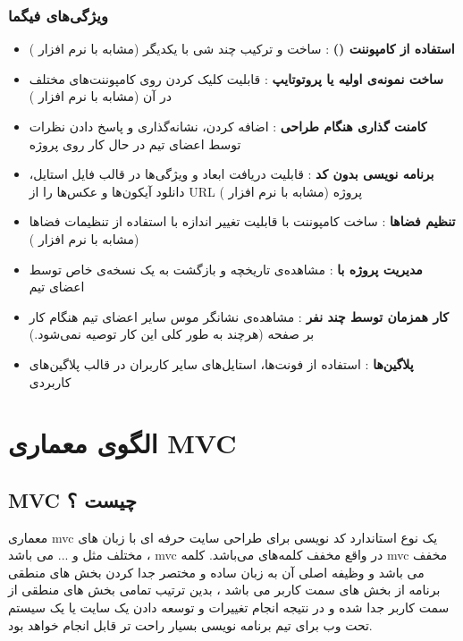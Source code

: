 \subsubsection{ویژگی‌های فیگما}
\begin{itemize}
	\item 
	\textbf{استفاده از کامپوننت ()}
	: ساخت و ترکیب چند شی با یکدیگر (مشابه با نرم افزار )
	\item 
	\textbf{ساخت نمونه‌ی اولیه یا پروتوتایپ}
	: قابلیت کلیک کردن روی کامپوننت‌های مختلف در آن (مشابه با نرم افزار )
	\item 
	\textbf{کامنت گذاری هنگام طراحی}
	: اضافه کردن، نشانه‌گذاری و پاسخ دادن نظرات توسط اعضای تیم در حال کار روی پروژه
	\item 
	\textbf{برنامه نویسی بدون کد}
	: قابلیت دریافت ابعاد و ویژگی‌ها در قالب فایل استایل‌، دانلود آیکون‌ها و عکس‌ها را از URL پروژه (مشابه با نرم افزار )
	\item 
	\textbf{تنظیم فضا‌ها}
	: ساخت کامپوننت‌ با قابلیت تغییر اندازه با استفاده از تنظیمات فضاها (مشابه با نرم افزار )
	\item 
	\textbf{مدیریت پروژه با 
		}
	: مشاهده‌ی تاریخچه و بازگشت به یک نسخه‌ی خاص توسط اعضای تیم
	\item 
	\textbf{کار همزمان توسط چند نفر}
	: مشاهده‌ی نشانگر موس سایر اعضای تیم هنگام کار بر صفحه (هرچند به طور کلی این کار توصیه نمی‌شود.)
	\item 
	\textbf{پلاگین‌ها}
	: استفاده از فونت‌ها، استایل‌های سایر کاربران در قالب پلاگین‌های کاربردی
\end{itemize}


\section{الگوی معماری MVC}
\subsection{MVC‌ چیست ؟}
معماری mvc یک نوع استاندارد کد نویسی برای طراحی سایت حرفه ای با زبان های مختلف مثل
 و ... می باشد ، mvc در واقع مخفف کلمه‌های
  می‌باشد.
کلمه mvc مخفف
 می باشد و وظیفه اصلی آن به زبان ساده و مختصر جدا کردن بخش های منطقی برنامه از بخش های سمت کاربر می باشد ، بدین ترتیب تمامی بخش های منطقی از سمت کاربر جدا شده و در نتیجه انجام تغییرات و توسعه دادن یک سایت یا یک سیستم تحت وب برای تیم برنامه نویسی بسیار راحت تر قابل انجام خواهد بود.

